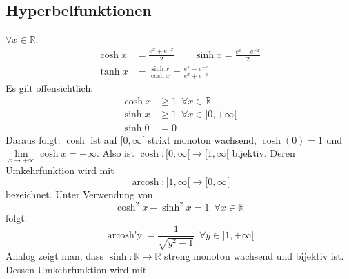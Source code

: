 \documentclass[landscape, 10pt]{article}
\newcommand{\R}{\mathbb{R}}
\begin{document}
\begin{multicols}{3}
       \subsection{Hyperbelfunktionen}
              \textcolor{NavyBlue}{
              $\forall x\in\R$}:
              \begin{align*}{}
                    \cosh x&=\frac{e^x+e^{-x}}{2}\qquad
                    \sinh x=\frac{e^x-e^{-x}}{2}\\
                    \tanh x&=\frac{\sinh x}{\cosh x}
                     =\frac{e^x-e^{-x}}{e^x+e^{-x}}
              \end{align*}
              Es gilt offensichtlich:
              \begin{align*}
                     \cosh x&\geqslant1\enspace
                     \forall x\in\R\\
                     \sinh x&\geqslant1\enspace
                     \forall x\in]0,+\infty[\\
                     \sinh0&=0
              \end{align*}
              Daraus folgt: 
              \textcolor{NavyBlue}{$\cosh$} ist 
              auf \textcolor{NavyBlue}{$[0,\infty[$} strikt
              monoton wachsend, 
              \textcolor{NavyBlue}{$\cosh(0)=1$} und
              \textcolor{NavyBlue}{
              $\lim\limits_{x\to+\infty}\cosh x=+\infty$}. 
              Also ist \textcolor{NavyBlue}{
              $\cosh:[0,\infty[\longrightarrow[1,\infty[$}
              bijektiv. Deren Umkehrfunktion wird mit
              \begin{equation*}
                     \operatorname{arcosh}:[1,\infty[
                     \longrightarrow[0,\infty[ 
              \end{equation*} 
              bezeichnet. Unter Verwendung von
              \begin{equation*}
                   \cosh^2x-\sinh^2x=1\enspace\forall x\in\R  
              \end{equation*}
              folgt:
              \begin{equation*}
                     \operatorname{arcosh'y}
                     =\frac{1}{\sqrt{y^2-1}}
                     \enspace\forall y\in]1,+\infty[ 
              \end{equation*}
              Analog zeigt man, dass \textcolor{NavyBlue}{
              $\sinh:\R\longrightarrow\R$} streng monoton
              wachsend und bijektiv ist. Dessen Umkehrfunktion 
              wird mit 

\end{multicols}
\end{document}
